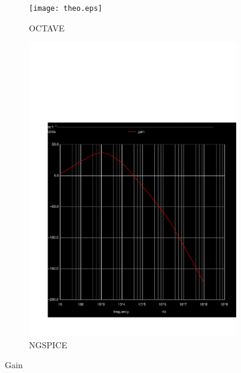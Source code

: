 \begin{figure}[H] 
\centering
\begin{subfigure}{0.3\textwidth}
\texttt{[image: theo.eps]}
\caption{OCTAVE}
\label{Octave_gain}
\end{subfigure}
\begin{subfigure}{0.3\textwidth}
\includegraphics[width=\textwidth]{Gain.pdf}
\caption{NGSPICE}
\label{Ngspice_gain}
\end{subfigure}
\caption{Gain}
\end{figure}





